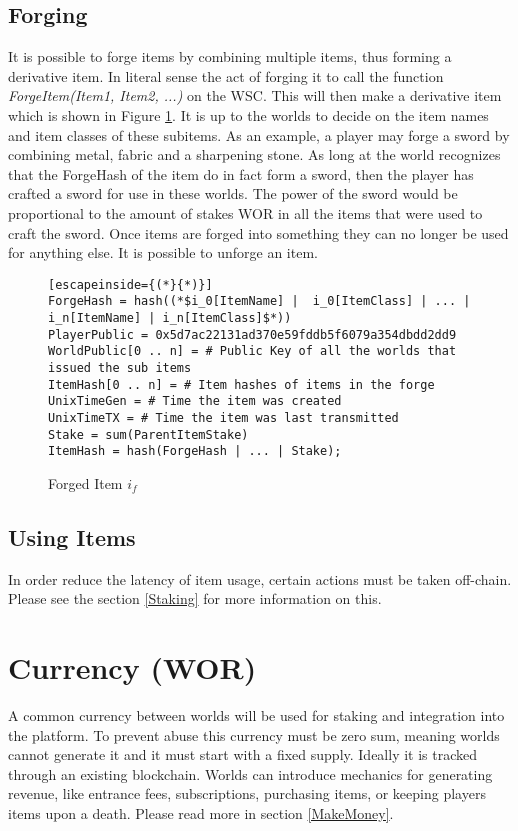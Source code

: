 \documentclass[runningheads,a4paper]{llncs}
\begin{document}
\subsection{Forging}
\label{Forging}
It is possible to forge items by combining multiple items, thus forming a derivative item. In literal sense the act of forging it to call the function \textit{ForgeItem(Item1, Item2, ...)} on the WSC. This will then make a derivative item which is shown in Figure \ref{ForgedItem}. It is up to the worlds to decide on the item names and item classes of these subitems. As an example, a player may forge a sword by combining metal, fabric and a sharpening stone. As long at the world recognizes that the ForgeHash of the item do in fact form a sword, then the player has crafted a sword for use in these worlds. The power of the sword would be proportional to the amount of stakes WOR in all the items that were used to craft the sword. Once items are forged into something they can no longer be used for anything else. It is possible to unforge an item.

\begin{figure}[H]
\centering
\caption{Forged Item $i_f$}
\label{ForgedItem}
\begin{lstlisting}[escapeinside={(*}{*)}]
ForgeHash = hash((*$i_0[ItemName] |  i_0[ItemClass] | ... | i_n[ItemName] | i_n[ItemClass]$*))
PlayerPublic = 0x5d7ac22131ad370e59fddb5f6079a354dbdd2dd9
WorldPublic[0 .. n] = # Public Key of all the worlds that issued the sub items
ItemHash[0 .. n] = # Item hashes of items in the forge
UnixTimeGen = # Time the item was created
UnixTimeTX = # Time the item was last transmitted
Stake = sum(ParentItemStake)
ItemHash = hash(ForgeHash | ... | Stake);
\end{lstlisting}
\end{figure}

\subsection{Using Items}
In order reduce the latency of item usage, certain actions must be taken off-chain. Please see the section \ref{Staking} for more information on this.

\section{Currency (WOR)}
\label{money}
A common currency between worlds will be used for staking and integration into the platform. To prevent abuse this currency must be zero sum, meaning worlds cannot generate it and it must start with a fixed supply. Ideally it is tracked through an existing blockchain. Worlds can introduce mechanics for generating revenue, like entrance fees, subscriptions, purchasing items, or keeping players items upon a death. Please read more in section \ref{MakeMoney}.
\end{document}
